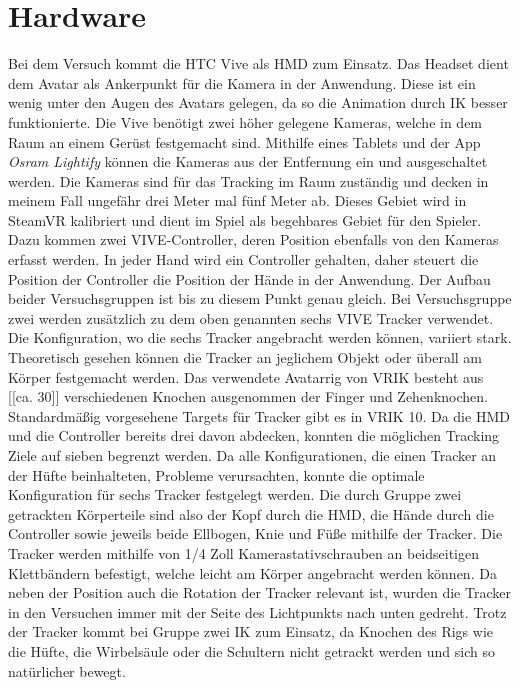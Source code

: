 \section{Hardware}
Bei dem Versuch kommt die HTC Vive als HMD zum Einsatz. Das Headset dient dem Avatar als Ankerpunkt für die Kamera in der Anwendung. Diese ist ein wenig unter den Augen des Avatars gelegen, da so die Animation durch IK besser funktionierte. Die Vive benötigt zwei höher gelegene Kameras, welche in dem Raum an einem Gerüst festgemacht sind. Mithilfe eines Tablets und der App \textit{Osram Lightify} können die Kameras aus der Entfernung ein und ausgeschaltet werden. Die Kameras sind für das Tracking im Raum zuständig und decken in meinem Fall ungefähr drei Meter mal fünf Meter ab. Dieses Gebiet wird in SteamVR kalibriert und dient im Spiel als begehbares Gebiet für den Spieler.
Dazu kommen zwei VIVE-Controller, deren Position ebenfalls von den Kameras erfasst werden. In jeder Hand wird ein Controller gehalten, daher steuert die Position der Controller die Position der Hände in der Anwendung.  Der Aufbau beider Versuchsgruppen ist bis zu diesem Punkt genau gleich.
Bei Versuchsgruppe zwei werden zusätzlich zu dem oben genannten sechs VIVE Tracker verwendet. Die Konfiguration, wo die sechs Tracker angebracht werden können, variiert stark. Theoretisch gesehen können die Tracker an jeglichem Objekt oder überall am Körper festgemacht werden. Das verwendete Avatarrig von VRIK besteht aus [[ca. 30]] verschiedenen Knochen ausgenommen der Finger und Zehenknochen. Standardmäßig vorgesehene Targets für Tracker gibt es in VRIK 10. Da die HMD und die Controller bereits drei davon abdecken, konnten die möglichen Tracking Ziele auf sieben begrenzt werden. Da alle Konfigurationen, die einen Tracker an der Hüfte beinhalteten, Probleme verursachten, konnte die optimale Konfiguration für sechs Tracker festgelegt werden. Die durch Gruppe zwei getrackten Körperteile sind also der Kopf durch die HMD, die Hände durch die Controller sowie jeweils beide Ellbogen, Knie und Füße mithilfe der Tracker. 
Die Tracker werden mithilfe von 1/4 Zoll Kamerastativschrauben an beidseitigen Klettbändern befestigt, welche leicht am Körper angebracht werden können. Da neben der Position auch die Rotation der Tracker relevant ist, wurden die Tracker in den Versuchen immer mit der Seite des Lichtpunkts nach unten gedreht.
Trotz der Tracker kommt bei Gruppe zwei IK zum Einsatz, da Knochen des Rigs wie die Hüfte, die Wirbelsäule oder die Schultern nicht getrackt werden und sich so natürlicher bewegt.

